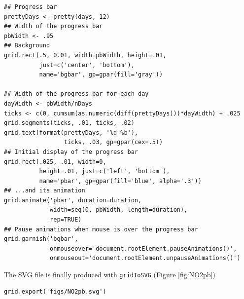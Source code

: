\documentclass[smallroyalvopaper]{memoir}
\begin{document}

\lstset{language=R,numbers=none}
\begin{lstlisting}
## Progress bar
prettyDays <- pretty(days, 12)
## Width of the progress bar
pbWidth <- .95
## Background
grid.rect(.5, 0.01, width=pbWidth, height=.01,
          just=c('center', 'bottom'),
          name='bgbar', gp=gpar(fill='gray'))

## Width of the progress bar for each day
dayWidth <- pbWidth/nDays
ticks <- c(0, cumsum(as.numeric(diff(prettyDays)))*dayWidth) + .025
grid.segments(ticks, .01, ticks, .02)
grid.text(format(prettyDays, '%d-%b'),
                 ticks, .03, gp=gpar(cex=.5))
## Initial display of the progress bar
grid.rect(.025, .01, width=0,
          height=.01, just=c('left', 'bottom'),
          name='pbar', gp=gpar(fill='blue', alpha='.3'))
## ...and its animation
grid.animate('pbar', duration=duration,
             width=seq(0, pbWidth, length=duration),
             rep=TRUE)
## Pause animations when mouse is over the progress bar
grid.garnish('bgbar',
             onmouseover='document.rootElement.pauseAnimations()',
             onmouseout='document.rootElement.unpauseAnimations()')
\end{lstlisting}

The SVG file is finally produced with \texttt{gridToSVG} (Figure \ref{fig:NO2pb})


\lstset{language=R,numbers=none}
\begin{lstlisting}
grid.export('figs/NO2pb.svg')
\end{lstlisting}
\end{document}
